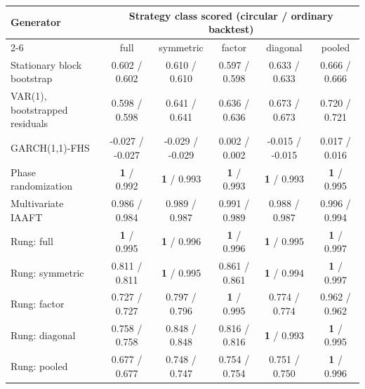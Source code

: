 \begin{tabular}{lccccc}
\toprule
Generator & \multicolumn{5}{c}{Strategy class scored (circular / ordinary backtest)} \\
\cmidrule(lr){2-6}
 & full & symmetric & factor & diagonal & pooled \\
\midrule
Stationary block bootstrap & 0.602 / 0.602 & 0.610 / 0.610 & 0.597 / 0.598 & 0.633 / 0.633 & 0.666 / 0.666 \\
VAR(1), bootstrapped residuals & 0.598 / 0.598 & 0.641 / 0.641 & 0.636 / 0.636 & 0.673 / 0.673 & 0.720 / 0.721 \\
GARCH(1,1)-FHS & -0.027 / -0.027 & -0.029 / -0.029 & 0.002 / 0.002 & -0.015 / -0.015 & 0.017 / 0.016 \\
Phase randomization & \textbf{1} / 0.992 & \textbf{1} / 0.993 & \textbf{1} / 0.993 & \textbf{1} / 0.993 & \textbf{1} / 0.995 \\
Multivariate IAAFT & 0.986 / 0.984 & 0.989 / 0.987 & 0.991 / 0.989 & 0.988 / 0.987 & 0.996 / 0.994 \\
\midrule
Rung: full & \textbf{1} / 0.995 & \textbf{1} / 0.996 & \textbf{1} / 0.996 & \textbf{1} / 0.995 & \textbf{1} / 0.997 \\
Rung: symmetric & 0.811 / 0.811 & \textbf{1} / 0.995 & 0.861 / 0.861 & \textbf{1} / 0.994 & \textbf{1} / 0.997 \\
Rung: factor & 0.727 / 0.727 & 0.797 / 0.796 & \textbf{1} / 0.995 & 0.774 / 0.774 & 0.962 / 0.962 \\
Rung: diagonal & 0.758 / 0.758 & 0.848 / 0.848 & 0.816 / 0.816 & \textbf{1} / 0.993 & \textbf{1} / 0.995 \\
Rung: pooled & 0.677 / 0.677 & 0.748 / 0.747 & 0.754 / 0.754 & 0.751 / 0.750 & \textbf{1} / 0.996 \\
\bottomrule
\end{tabular}